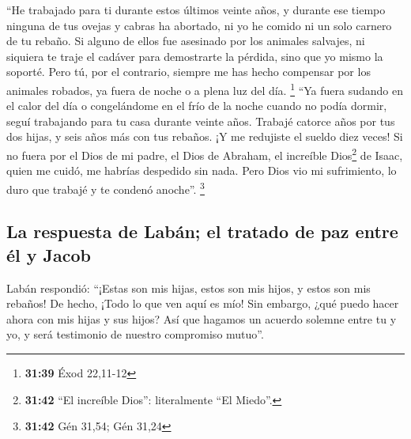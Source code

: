  ``He trabajado para ti durante estos últimos veinte
años, y durante ese tiempo ninguna de tus ovejas y cabras ha abortado,
ni yo he comido ni un solo carnero de tu rebaño.  Si
alguno de ellos fue asesinado por los animales salvajes, ni siquiera te
traje el cadáver para demostrarte la pérdida, sino que yo mismo la
soporté. Pero tú, por el contrario, siempre me has hecho compensar por
los animales robados, ya fuera de noche o a plena luz del día.
\footnote{\textbf{31:39} Éxod 22,11-12}  ``Ya fuera
sudando en el calor del día o congelándome en el frío de la noche cuando
no podía dormir, seguí trabajando para tu casa durante veinte años.
 Trabajé catorce años por tus dos hijas, y seis años más
con tus rebaños. ¡Y me redujiste el sueldo diez veces! 
Si no fuera por el Dios de mi padre, el Dios de Abraham, el increíble
Dios\footnote{\textbf{31:42} ``El increíble Dios'': literalmente ``El
  Miedo''.} de Isaac, quien me cuidó, me habrías despedido sin nada.
Pero Dios vio mi sufrimiento, lo duro que trabajé y te condenó anoche''.
\footnote{\textbf{31:42} Gén 31,54; Gén 31,24}

\hypertarget{la-respuesta-de-labuxe1n-el-tratado-de-paz-entre-uxe9l-y-jacob}{%
\subsection{La respuesta de Labán; el tratado de paz entre él y
Jacob}\label{la-respuesta-de-labuxe1n-el-tratado-de-paz-entre-uxe9l-y-jacob}}

 Labán respondió: ``¡Estas son mis hijas, estos son mis
hijos, y estos son mis rebaños! De hecho, ¡Todo lo que ven aquí es mío!
Sin embargo, ¿qué puedo hacer ahora con mis hijas y sus hijos?
 Así que hagamos un acuerdo solemne entre tu y yo, y será
testimonio de nuestro compromiso mutuo''.

